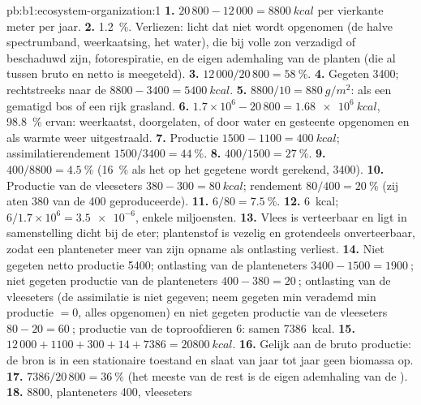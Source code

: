 \begin{solution}{pb:b1:ecosystem-organization:1}
\textbf{1.} $20\,800 - 12\,000 = \qty{8800}{kcal}$ per vierkante meter per
jaar.
\textbf{2.} \qty{1.2}{\%}. Verliezen: licht dat niet wordt opgenomen (de
halve spectrumband, weerkaatsing, het water),  die bij volle zon
verzadigd of beschaduwd zijn, fotorespiratie, en de eigen ademhaling van de
planten (die al tussen bruto en netto is meegeteld).
\textbf{3.} $12\,000/20\,800 = \qty{58}{\%}$.
\textbf{4.} Gegeten \qty{3400}{}; rechtstreeks naar de 
$8800 - 3400 = \qty{5400}{kcal}$.
\textbf{5.} $8800/10 = \qty{880}{g/m^2}$: als een gematigd bos of een rijk
grasland.
\textbf{6.} $1.7\times 10^6 - 20\,800 = \qty{1.68e6}{kcal}$, \qty{98.8}{\%}
ervan: weerkaatst, doorgelaten, of door water en gesteente opgenomen en als
warmte weer uitgestraald.
\textbf{7.} Productie $1500 - 1100 = \qty{400}{kcal}$;
assimilatierendement $1500/3400 = \qty{44}{\%}$.
\textbf{8.} $400/1500 = \qty{27}{\%}$.
\textbf{9.} $400/8800 = \qty{4.5}{\%}$ (\qty{16}{\%} als het op het
gegetene wordt gerekend, \qty{3400}{}).
\textbf{10.} Productie van de vleeseters $380 - 300 = \qty{80}{kcal}$;
rendement $80/400 = \qty{20}{\%}$ (zij aten \qty{380}{} van de
\qty{400}{} geproduceerde).
\textbf{11.} $6/80 = \qty{7.5}{\%}$.
\textbf{12.} \qty{6}{kcal}; $6/1.7\times 10^6 = \num{3.5e-6}$, enkele
miljoensten.
\textbf{13.} Vlees is verteerbaar en ligt in samenstelling dicht bij de
eter; plantenstof is vezelig en grotendeels onverteerbaar, zodat een
planteneter meer van zijn opname als ontlasting verliest.
\textbf{14.} Niet gegeten netto productie \qty{5400}{}; ontlasting van de
planteneters $3400 - 1500 = \qty{1900}{}$; niet gegeten productie van de
planteneters $400 - 380 = \qty{20}{}$; ontlasting van de vleeseters (de
assimilatie is niet gegeven; neem gegeten min verademd min productie
$= 0$, alles opgenomen) en niet gegeten productie van de vleeseters
$80 - 20 = \qty{60}{}$; productie van de toproofdieren
\qty{6}{}: samen \qty{7386}{kcal}.
\textbf{15.} $12\,000 + 1100 + 300 + 14 + 7386 = \qty{20800}{kcal}$.
\textbf{16.} Gelijk aan de bruto productie: de bron is in een stationaire
toestand en slaat van jaar tot jaar geen biomassa op.
\textbf{17.} $7386/20\,800 = \qty{36}{\%}$ (het meeste van de rest is de
eigen ademhaling van de ).
\textbf{18.}  \qty{8800}{}, planteneters \qty{400}{}, vleeseters

\end{solution}
